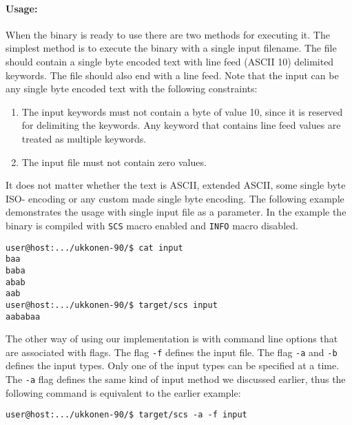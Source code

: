 \documentclass[english,twoside,censored,csm,algorithms-track-2020]{HYthesisML}
\theoremstyle{plain}
\theoremstyle{definition}
\begin{document}
\paragraph{Usage:}
When the binary is ready to use there are two methods for executing it. The simplest method is to
execute the binary with a single input filename. The file should contain a single byte encoded text with
line feed (ASCII 10) delimited keywords. The file should also end with a line feed. Note that the input
can be any single byte encoded text with the following constraints:

\begin{enumerate}
\item The input keywords must not contain a byte of value 10, since it is reserved for delimiting the
  keywords. Any keyword that contains line feed values are treated as multiple
  keywords.
\item The input file must not contain zero values.
\end{enumerate}

It does not matter whether the text is ASCII, extended ASCII, some single byte ISO- encoding or any
custom made single byte encoding. The following example demonstrates the usage with single input
file as a parameter. In the example the binary is compiled with \texttt{SCS} macro enabled and
\texttt{INFO} macro disabled.

\begin{verbatim}
user@host:.../ukkonen-90/$ cat input
baa
baba
abab
aab
user@host:.../ukkonen-90/$ target/scs input
aababaa
\end{verbatim}

The other way of using our implementation is with command line options that are associated with
flags. The flag \texttt{-f} defines the input file. The flag \texttt{-a} and \texttt{-b} defines
the input types. Only one of the
input types can be specified at a time. The \texttt{-a} flag defines the same kind of input method
we discussed earlier, thus the following command is equivalent to the earlier example:

\begin{verbatim}
user@host:.../ukkonen-90/$ target/scs -a -f input
\end{verbatim}
\end{document}
